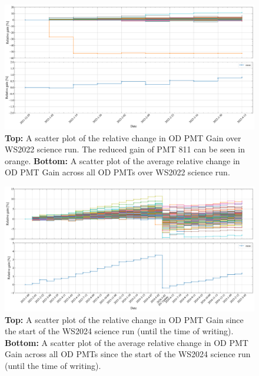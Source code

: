 \begin{figure}
    \centering
    \includegraphics[width=\textwidth]{figures/ODCommissioning/RelativegainOverTime_AllPMTs_Both_Full_WS2022.pdf}
    \caption{\textbf{Top:} A scatter plot of the relative change in OD PMT Gain over WS2022 science run. The reduced gain of PMT 811 can be seen in orange. \textbf{Bottom:} A scatter plot of the average relative change in OD PMT Gain across all OD PMTs over WS2022 science run.}
    \label{fig:ODCommissioning/RelativeGain_WS2022}
\end{figure}
\begin{figure}
    \centering
    \includegraphics[width=\textwidth]{figures/ODCommissioning/RelativegainOverTime_AllPMTs_Both_Full_WS2024.pdf}
    \caption{\textbf{Top:} A scatter plot of the relative change in OD PMT Gain since the start of the WS2024 science run (until the time of writing). \textbf{Bottom:} A scatter plot of the average relative change in OD PMT Gain across all OD PMTs since the start of the WS2024 science run (until the time of writing).}
    \label{fig:ODCommissioning/RelativeGain_WS2024}
\end{figure}
